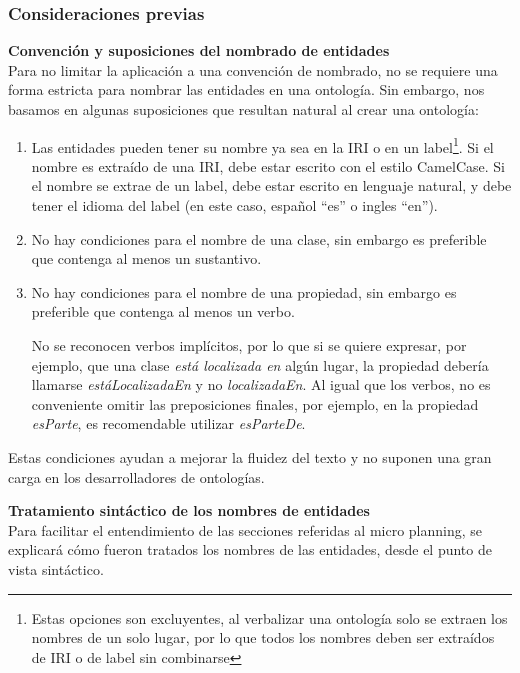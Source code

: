 \subsubsection{Consideraciones previas}
{\bf Convención y suposiciones del nombrado de entidades} \\
Para no limitar la aplicación a una convención de nombrado, no se requiere una forma estricta para nombrar las entidades en una ontología. Sin embargo, nos basamos en algunas suposiciones que resultan natural al crear una ontología:
\begin{enumerate}
    \item Las entidades pueden tener su nombre ya sea en la IRI o en un label\footnote{Estas opciones son excluyentes, al verbalizar una ontología solo se extraen los nombres de un solo lugar, por lo que todos los nombres deben ser extraídos de IRI o de label sin combinarse}. Si el nombre es extraído de una IRI, debe estar escrito con el estilo CamelCase. Si el nombre se extrae de un label, debe estar escrito en lenguaje natural, y debe tener el idioma del label (en este caso, español ``es'' o ingles ``en'').
    \item No hay condiciones para el nombre de una clase, sin embargo es preferible que contenga al menos un sustantivo.
    \item No hay condiciones para el nombre de una propiedad, sin embargo es preferible que contenga al menos un verbo. 
    
    No se reconocen verbos implícitos, por lo que si se quiere expresar, por ejemplo, que una clase \emph{está localizada en} algún lugar, la propiedad debería llamarse \emph{estáLocalizadaEn} y no \emph{localizadaEn}. Al igual que los verbos, no es conveniente omitir las preposiciones finales, por ejemplo, en la propiedad \emph{esParte}, es recomendable utilizar \emph{esParteDe}.
\end{enumerate}

Estas condiciones ayudan a mejorar la fluidez del texto y no suponen una gran carga en los desarrolladores de ontologías.

{\bf Tratamiento sintáctico de los nombres de entidades}\\
Para facilitar el entendimiento de las secciones referidas al micro planning, se explicará cómo fueron tratados los nombres de las entidades, desde el punto de vista sintáctico. 

